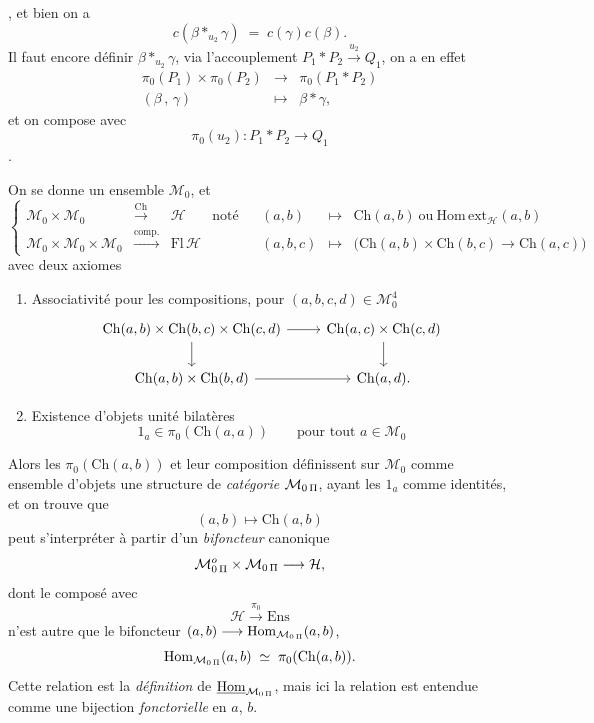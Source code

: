 , et bien on a
\[
\boxed{\;c(\beta *_{u_2}\gamma) \;=\; c(\gamma)c(\beta).\;}
\]
Il faut encore définir $\beta *_{u_2}\gamma$, via l'accouplement $P_1*P_2\xrightarrow{u_2}Q_1$, on a en effet
\[
\begin{array}{ccc}
\pi_0(P_1)\times\pi_0(P_2) & \longrightarrow & \pi_0(P_1*P_2)\\
(\beta\,,\,\gamma) & \longmapsto & \beta*\gamma,
\end{array}
\]
et on compose avec
\[
\pi_0(u_2) : P_1*P_2 \longrightarrow Q_1
\]
.

On se donne un ensemble $\mathcal{M}_0$, et
\[
\left\{
\begin{array}{rclccrcl}
\mathcal{M}_0\times\mathcal{M}_0 & \xrightarrow{\mathrm{Ch}} & \mathcal{H} & \text{noté} & & (a,b) & \longmapsto & \mathrm{Ch}(a,b)\ \text{ou}\ \mathrm{Hom\,ext}_{\mathcal{H}}(a,b)\\
\mathcal{M}_0\times\mathcal{M}_0\times\mathcal{M}_0 & \xrightarrow{\text{comp.}} & \mathrm{Fl}\,\mathcal{H} & & & (a,b,c) & \longmapsto & \bigl(\mathrm{Ch}(a,b)\times\mathrm{Ch}(b,c)\longrightarrow\mathrm{Ch}(a,c)\bigr)
\end{array}
\right.
\]
avec deux axiomes

\begin{enumerate}
\item[a)] Associativité pour les compositions, pour $(a,b,c,d)\in\mathcal{M}_0^4$
\[
\begin{tikzcd}
\mathrm{Ch}(a,b)\times\mathrm{Ch}(b,c)\times\mathrm{Ch}(c,d) \arrow[r] \arrow[d] & \mathrm{Ch}(a,c)\times\mathrm{Ch}(c,d) \arrow[d]\\
\mathrm{Ch}(a,b)\times\mathrm{Ch}(b,d) \arrow[r] & \mathrm{Ch}(a,d).
\end{tikzcd}
\]
\item[b)] Existence d'objets unité bilatères
\[
1_a\in\pi_0(\mathrm{Ch}(a,a)) \qquad \text{pour tout } a\in\mathcal{M}_0
\]
\end{enumerate}

Alors les $\pi_0(\mathrm{Ch}(a,b))$ et leur composition définissent sur $\mathcal{M}_0$ comme ensemble d'objets une structure de \textit{catégorie} $\mathcal{M}_{0\,\Pi}$, ayant les $1_a$ comme identités, et on trouve que
\[
(a,b)\longmapsto\mathrm{Ch}(a,b)
\]
peut s'interpréter à partir d'un \textit{bifoncteur} canonique
\[
\mathcal{M}^o_{0\,\Pi}\times\mathcal{M}_{0\,\Pi} \longrightarrow \mathcal{H},
\]
dont le composé avec
\[
\mathcal{H}\xrightarrow{\pi_0}\mathrm{Ens}
\]
n'est autre que le bifoncteur $(a,b)\longrightarrow\mathrm{Hom}_{\mathcal{M}_{0\,\Pi}}(a,b)$,
\[
\mathrm{Hom}_{\mathcal{M}_{0\,\Pi}}(a,b) \;\simeq\; \pi_0(\mathrm{Ch}(a,b)).
\]
Cette relation est la \textit{définition} de $\underline{\mathrm{Hom}}_{\mathcal{M}_{0\,\Pi}}$, mais ici la relation est entendue comme une %
bijection \textit{fonctorielle} en $a$, $b$.

